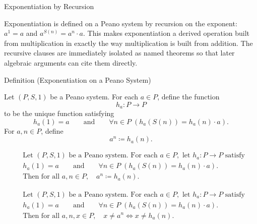 \label{sec:powers-and-growth}

\begin{topicbox}{Exponentiation by Recursion}
\begin{exposition}
Exponentiation is defined on a Peano system by recursion on the exponent:
$a^1 = a$ and $a^{S(n)} = a^n \cdot a$. This makes exponentiation a derived
operation built from multiplication in exactly the way multiplication is built
from addition. The recursive clauses are immediately isolated as named theorems
so that later algebraic arguments can cite them directly.
\end{exposition}

\begin{definitionbox}{Definition (Exponentiation on a Peano System)}
\begin{definition}
\label{def:exponentiation-on-peano-system}
Let $(P,S,1)$ be a Peano system. For each $a \in P$, define the function
\[
h_a : P \to P
\]
to be the unique function satisfying
\[
h_a(1)=a
\qquad\text{and}\qquad
\forall n \in P\;(h_a(S(n))=h_a(n)\cdot a).
\]
For $a,n \in P$, define
\[
a^n \coloneqq h_a(n).
\]
\end{definition}
\end{definitionbox}

\begin{remark*}
\[
\begin{aligned}
&\text{Let } (P,S,1) \text{ be a Peano system. For each } a \in P,
\text{ let } h_a : P \to P \text{ satisfy}\\
&h_a(1)=a
\qquad\text{and}\qquad
\forall n \in P\;(h_a(S(n))=h_a(n)\cdot a).\\
&\text{Then for all } a,n \in P,\quad a^n \coloneqq h_a(n).
\end{aligned}
\]
\end{remark*}

\begin{remark*}
\[
\begin{aligned}
&\text{Let } (P,S,1) \text{ be a Peano system. For each } a \in P,
\text{ let } h_a : P \to P \text{ satisfy}\\
&h_a(1)=a
\qquad\text{and}\qquad
\forall n \in P\;(h_a(S(n))=h_a(n)\cdot a).\\
&\text{Then for all } a,n,x \in P,\quad
x \neq a^n \Longleftrightarrow x \neq h_a(n).
\end{aligned}
\]
\end{remark*}


\end{topicbox}
